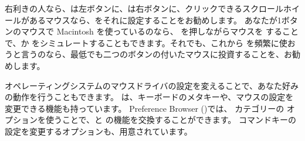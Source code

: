 \documentclass[a4paper,10pt,twoside]{book}
\begin{document}





右利きの人なら、\click は左ボタンに、\actclick は右ボタンに、クリックできるスクロールホイールがあるマウスなら、\metaclick をそれに設定することをお勧めします。
あなたが1ボタンのマウスで Macintosh を使っているのなら、\clover{} を押しながらマウスを \click することで、\actclick か \metaclick をシミュレートすることもできます。それでも、これから \pharo を頻繁に使おうと言うのなら、最低でも二つのボタンの付いたマウスに投資することを、お勧めします。

オペレーティングシステムのマウスドライバの設定を変えることで、あなた好みの動作を行うこともできます。
\pharo は、キーボードのメタキーや、マウスの設定を変更できる機能も持っています。
Preference Browser ()では、 カテゴリーの  オプションを使うことで、\actclick と \metaclick の機能を交換することができます。
コマンドキーの設定を変更するオプションも、用意されています。
\end{document}
